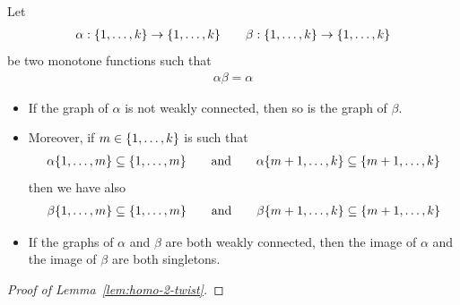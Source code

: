 \begin{lemma}
Let
\begin{align*}
\alpha:\{1,\dots,k\}\to\{1,\dots,k\}\qquad
\beta:\{1,\dots,k\}\to\{1,\dots,k\}
\end{align*} 
be two monotone functions such that
\begin{align*}
\alpha\beta=\alpha
\end{align*}
\begin{itemize}
\item If the graph of $\alpha$ is not weakly connected, then so is the graph of $\beta$. 
\item Moreover, if $m\in \{1,\dots, k\}$ is such that 
\begin{align*}
\alpha\{1,\dots,m\}\subseteq \{1,\dots,m\} \qquad \text{and}\qquad 
\alpha\{m+1,\dots,k\}\subseteq \{m+1,\dots,k\}
\end{align*}
then we have also 
\begin{align*}
\beta\{1,\dots,m\}\subseteq \{1,\dots,m\} \qquad \text{and}\qquad 
\beta\{m+1,\dots,k\}\subseteq \{m+1,\dots,k\}
\end{align*}
\item If the graphs of $\alpha$ and $\beta$ are both weakly connected, then the image of $\alpha$ and the image of $\beta$ are both singletons.
\end{itemize}
\end{lemma}

\begin{proof}[Proof of Lemma~\ref{lem:homo-2-twist}]

\end{proof}
